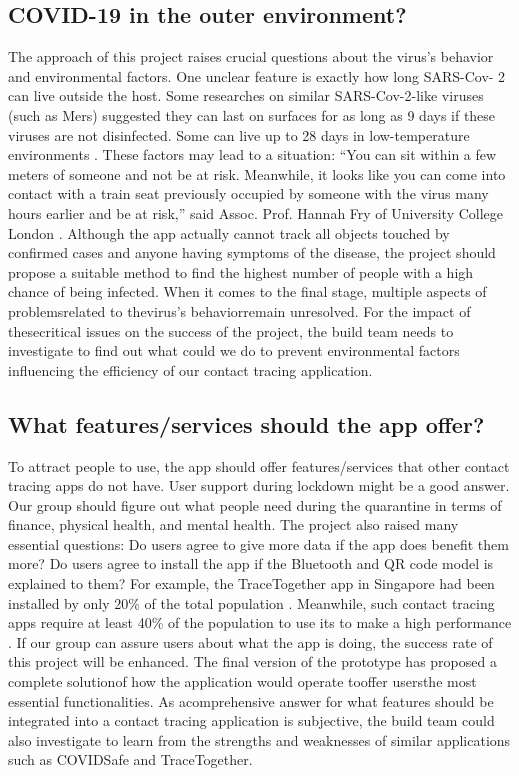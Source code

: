   \subsection{COVID-19 in the outer environment?}
    \par The approach of this project raises crucial questions about the virus’s behavior and environmental factors. One unclear feature is exactly how long SARS-Cov- 2 can live outside the host. Some researches on similar SARS-Cov-2-like viruses (such as Mers) suggested they can last on surfaces for as long as 9 days if these viruses are not disinfected. Some can live up to 28 days in low-temperature environments \parencite{Questions3}. These factors may lead to a situation: “You can sit within a few meters of someone and not be at risk. Meanwhile, it looks like you can come into contact with a train seat previously occupied by someone with the virus many hours earlier and be at risk,” said Assoc. Prof. Hannah Fry of University College London \parencite{Questions4}. Although the app actually cannot track all objects touched by confirmed cases and anyone having symptoms of the disease, the project should propose a suitable method to find the highest number of people with a high chance of being infected. When  it  comes  to  the  final  stage, multiple aspects of problemsrelated to thevirus’s behaviorremain unresolved. For the impact of thesecritical issues on the success of the project, the build team needs to investigate to find out what could we do to prevent environmental factors influencing  the efficiency  of our contact tracing application.

  \subsection{What features/services should the app offer?}
    \par To attract people to use, the app should offer features/services that other contact tracing apps do not have. User support during lockdown might be a good answer. Our group should figure out what people need during the quarantine in terms of finance, physical health, and mental health. The project also raised many essential questions: Do users agree to give more data if the app does benefit them more? Do users agree to install the app if the Bluetooth and QR code model is explained to them? For example, the TraceTogether app in Singapore had been installed by only 20\% of the total population \parencite{SingTraceTogether}. Meanwhile, such contact tracing apps require at least 40\% of the population to use its to make a high performance \parencite{Questions5}. If our group can assure users about what the app is doing, the success rate of this project will be enhanced. The  final  version  of  the  prototype  has proposed a complete solutionof how the application would operate tooffer usersthe most essential functionalities. As acomprehensive answer for what features should be integrated into a contact tracing application is subjective, the build team could also investigate to learn from  the  strengths  and  weaknesses  of  similar applications  such  as COVIDSafe and TraceTogether.

